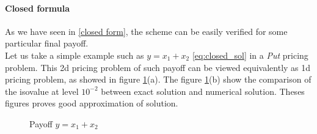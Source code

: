 \documentclass[a4paper,10pt]{article}
\begin{document}
\paragraph{Closed formula} As we have seen in \ref{closed form}, the scheme can be easily verified for some particular final payoff. \\
Let us take a simple example such as $y = x_1+x_2$ \eqref{eq:closed_sol} in a \emph{Put} pricing problem. This 2d pricing problem of such payoff can be viewed equivalently as 1d pricing problem, as showed in figure \ref{fig: Results}(a). The figure \ref{fig: Results}(b) show the comparison of the isovalue at level $10^{-2}$ between exact solution and numerical solution. Theses figures proves good approximation of solution.
\begin{figure}[ht]
\centering
{}
\quad
{}
\caption[Payoff ]{Payoff \hspace{0.1cm}$ y=x_1+x_2$}
\label{fig: Results}
\end{figure}
\end{document}
